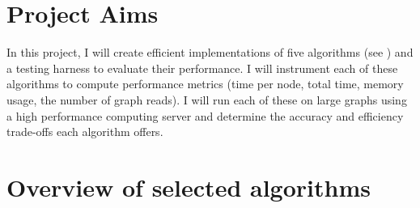 \documentclass[12pt,a4paper,twoside,openright]{report}
\begin{document}
	\section{Project Aims}
	
	In this project, I will create efficient implementations of five algorithms (see ) and a testing harness to evaluate their performance. I will instrument each of these algorithms to compute performance metrics (time per node, total time, memory usage, the number of graph reads). I will run each of these on large graphs using a high performance computing server and determine the accuracy and efficiency trade-offs each algorithm offers.
	
		\section{Overview of selected algorithms} 
\end{document}
